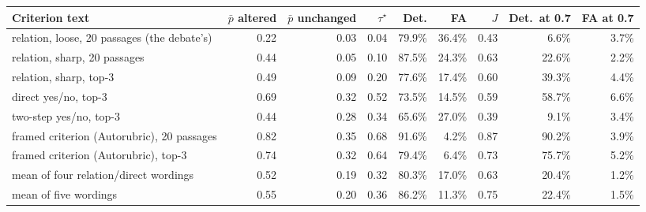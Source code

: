 \begin{tabular}{@{}lrrrrrrrr@{}}
\toprule
Criterion text & $\bar p$ altered & $\bar p$ unchanged & $\tau^\star$ & Det. & FA & $J$ & Det.\ at 0.7 & FA at 0.7 \\
\midrule
relation, loose, 20 passages (the debate's) & 0.22 & 0.03 & 0.04 & 79.9\% & 36.4\% & 0.43 & 6.6\% & 3.7\% \\
relation, sharp, 20 passages & 0.44 & 0.05 & 0.10 & 87.5\% & 24.3\% & 0.63 & 22.6\% & 2.2\% \\
relation, sharp, top-3 & 0.49 & 0.09 & 0.20 & 77.6\% & 17.4\% & 0.60 & 39.3\% & 4.4\% \\
direct yes/no, top-3 & 0.69 & 0.32 & 0.52 & 73.5\% & 14.5\% & 0.59 & 58.7\% & 6.6\% \\
two-step yes/no, top-3 & 0.44 & 0.28 & 0.34 & 65.6\% & 27.0\% & 0.39 & 9.1\% & 3.4\% \\
framed criterion (Autorubric), 20 passages & 0.82 & 0.35 & 0.68 & 91.6\% & 4.2\% & 0.87 & 90.2\% & 3.9\% \\
framed criterion (Autorubric), top-3 & 0.74 & 0.32 & 0.64 & 79.4\% & 6.4\% & 0.73 & 75.7\% & 5.2\% \\
mean of four relation/direct wordings & 0.52 & 0.19 & 0.32 & 80.3\% & 17.0\% & 0.63 & 20.4\% & 1.2\% \\
mean of five wordings & 0.55 & 0.20 & 0.36 & 86.2\% & 11.3\% & 0.75 & 22.4\% & 1.5\% \\
\bottomrule
\end{tabular}

